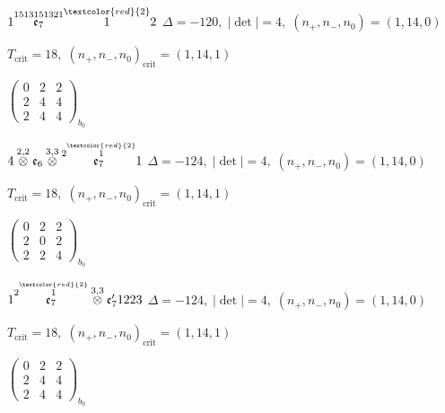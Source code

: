 \documentclass[10pt]{article}
\begin{document}
$1\overset{1513151321}{\mathfrak{e}_7}\overset{\textcolor{red}{2}}{1}2$ \quad $\Delta=-120,\; |\det|=4,\; (n_+,n_-,n_0)=(1,14,0)$

\hspace{1em}$T_{\text{crit}}=18,\; (n_+,n_-,n_0)_{\text{crit}}=(1,14,1)$

\hspace{2em}$\left(\begin{smallmatrix}0 & 2 & 2 \\ 2 & 4 & 4 \\ 2 & 4 & 4\end{smallmatrix}\right)_{\!b_0}$

\smallskip

$4\overset{2,2}{\otimes}\mathfrak{e}_6\overset{3,3}{\otimes}\overset{2\overset{\textcolor{red}{2}}{1}}{\mathfrak{e}_7}1$ \quad $\Delta=-124,\; |\det|=4,\; (n_+,n_-,n_0)=(1,14,0)$

\hspace{1em}$T_{\text{crit}}=18,\; (n_+,n_-,n_0)_{\text{crit}}=(1,14,1)$

\hspace{2em}$\left(\begin{smallmatrix}0 & 2 & 2 \\ 2 & 0 & 2 \\ 2 & 2 & 4\end{smallmatrix}\right)_{\!b_0}$

\smallskip

$1\overset{2\overset{\textcolor{red}{2}}{1}}{\mathfrak{e}_7}\overset{3,3}{\otimes}\mathfrak{e}_7'1223$ \quad $\Delta=-124,\; |\det|=4,\; (n_+,n_-,n_0)=(1,14,0)$

\hspace{1em}$T_{\text{crit}}=18,\; (n_+,n_-,n_0)_{\text{crit}}=(1,14,1)$

\hspace{2em}$\left(\begin{smallmatrix}0 & 2 & 2 \\ 2 & 4 & 4 \\ 2 & 4 & 4\end{smallmatrix}\right)_{\!b_0}$

\smallskip
\end{document}
